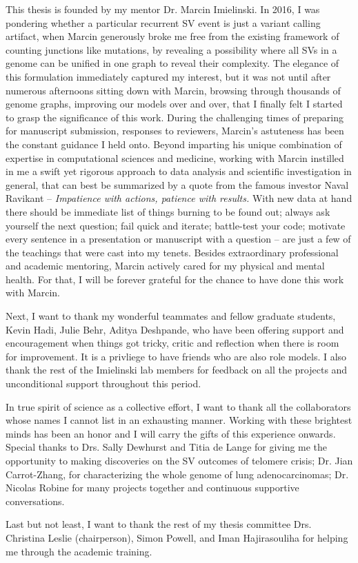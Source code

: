 \documentclass[phd,tocprelim]{cornell}
\begin{document}
\begin{acknowledgements}
    This thesis is founded by my mentor Dr. Marcin Imielinski. In 2016, I was pondering whether a particular recurrent SV event is just a variant calling artifact, when Marcin generously broke me free from the existing framework of counting junctions like mutations, by revealing a possibility where all SVs in a genome can be unified in one graph to reveal their complexity. The elegance of this formulation immediately captured my interest, but it was not until after numerous afternoons sitting down with Marcin, browsing through thousands of genome graphs, improving our models over and over, that I finally felt I started to grasp the significance of this work. During the challenging times of preparing for manuscript submission, responses to reviewers, Marcin's astuteness has been the constant guidance I held onto. Beyond imparting his unique combination of expertise in computational sciences and medicine, working with Marcin instilled in me a swift yet rigorous approach to data analysis and scientific investigation in general, that can best be summarized by a quote from the famous investor Naval Ravikant -- \textit{Impatience with actions, patience with results.} With new data at hand there should be immediate list of things burning to be found out; always ask yourself the next question; fail quick and iterate; battle-test your code; motivate every sentence in a presentation or manuscript with a question -- are just a few of the teachings that were cast into my tenets. Besides extraordinary professional and academic mentoring, Marcin actively cared for my physical and mental health. For that, I will be forever grateful for the chance to have done this work with Marcin.
    
    Next, I want to thank my wonderful teammates and fellow graduate students, Kevin Hadi, Julie Behr, Aditya Deshpande, who have been offering support and encouragement when things got tricky, critic and reflection when there is room for improvement. It is a privliege to have friends who are also role models. I also thank the rest of the Imielinski lab members for feedback on all the projects and unconditional support throughout this period.

    In true spirit of science as a collective effort, I want to thank all the collaborators whose names I cannot list in an exhausting manner. Working with these brightest minds has been an honor and I will carry the gifts of this experience onwards. Special thanks to Drs. Sally Dewhurst and Titia de Lange for giving me the opportunity to making discoveries on the SV outcomes of telomere crisis; Dr. Jian Carrot-Zhang, for characterizing the whole genome of lung adenocarcinomas; Dr. Nicolas Robine for many projects together and continuous supportive conversations.

    Last but not least, I want to thank the rest of my thesis committee Drs. Christina Leslie (chairperson), Simon Powell, and Iman Hajirasouliha for helping me through the academic training.
\end{acknowledgements}
\end{document}
